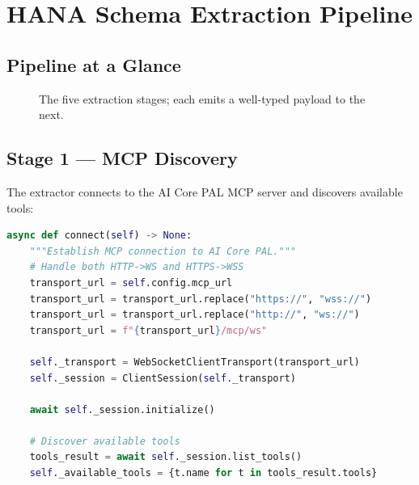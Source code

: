 \chapter{HANA Schema Extraction Pipeline}
\label{chap:extraction}

\section{Pipeline at a Glance}

\begin{figure}[H]
\centering
{}
\caption{The five extraction stages; each emits a well-typed payload to the next.}
\label{fig:extraction-pipeline}
\end{figure}

\section{Stage 1 --- MCP Discovery}

The extractor connects to the AI Core PAL MCP server and discovers available tools:

\begin{lstlisting}[language=Python,caption={MCP connection (hana\_schema\_extractor.py, lines 45--60)}]
async def connect(self) -> None:
    """Establish MCP connection to AI Core PAL."""
    # Handle both HTTP->WS and HTTPS->WSS
    transport_url = self.config.mcp_url
    transport_url = transport_url.replace("https://", "wss://")
    transport_url = transport_url.replace("http://", "ws://")
    transport_url = f"{transport_url}/mcp/ws"
    
    self._transport = WebSocketClientTransport(transport_url)
    self._session = ClientSession(self._transport)
    
    await self._session.initialize()
    
    # Discover available tools
    tools_result = await self._session.list_tools()
    self._available_tools = {t.name for t in tools_result.tools}
\end{lstlisting}

